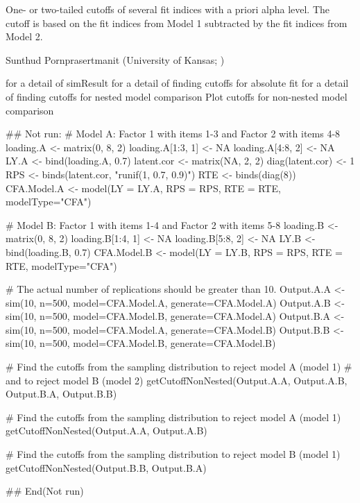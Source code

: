 \documentclass[a4paper]{book}
\begin{document}
%
\begin{Value}
One- or two-tailed cutoffs of several fit indices with a priori alpha level. The cutoff is based on the fit indices from Model 1 subtracted by the fit indices from Model 2.
\end{Value}
%
\begin{Author}\relax
Sunthud Pornprasertmanit (University of Kansas; )
\end{Author}
%
\begin{SeeAlso}\relax
{} for a detail of simResult
 for a detail of finding cutoffs for absolute fit
 for a detail of finding cutoffs for nested model comparison
 Plot cutoffs for non-nested model comparison
\end{SeeAlso}
%
\begin{Examples}
\begin{ExampleCode}
## Not run: 
# Model A: Factor 1 with items 1-3 and Factor 2 with items 4-8
loading.A <- matrix(0, 8, 2)
loading.A[1:3, 1] <- NA
loading.A[4:8, 2] <- NA
LY.A <- bind(loading.A, 0.7)
latent.cor <- matrix(NA, 2, 2)
diag(latent.cor) <- 1
RPS <- binds(latent.cor, "runif(1, 0.7, 0.9)")
RTE <- binds(diag(8))
CFA.Model.A <- model(LY = LY.A, RPS = RPS, RTE = RTE, modelType="CFA")

# Model B: Factor 1 with items 1-4 and Factor 2 with items 5-8
loading.B <- matrix(0, 8, 2)
loading.B[1:4, 1] <- NA
loading.B[5:8, 2] <- NA
LY.B <- bind(loading.B, 0.7)
CFA.Model.B <- model(LY = LY.B, RPS = RPS, RTE = RTE, modelType="CFA")

# The actual number of replications should be greater than 10.
Output.A.A <- sim(10, n=500, model=CFA.Model.A, generate=CFA.Model.A)
Output.A.B <- sim(10, n=500, model=CFA.Model.B, generate=CFA.Model.A)
Output.B.A <- sim(10, n=500, model=CFA.Model.A, generate=CFA.Model.B)
Output.B.B <- sim(10, n=500, model=CFA.Model.B, generate=CFA.Model.B)

# Find the cutoffs from the sampling distribution to reject model A (model 1)
# and to reject model B (model 2)
getCutoffNonNested(Output.A.A, Output.A.B, Output.B.A, Output.B.B)

# Find the cutoffs from the sampling distribution to reject model A (model 1)
getCutoffNonNested(Output.A.A, Output.A.B)

# Find the cutoffs from the sampling distribution to reject model B (model 1)
getCutoffNonNested(Output.B.B, Output.B.A)

## End(Not run)
\end{ExampleCode}
\end{Examples}
\end{document}
